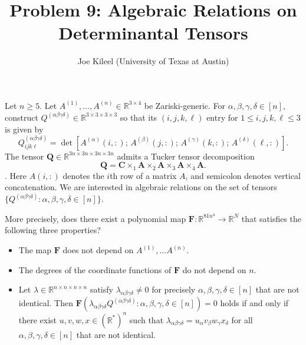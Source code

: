 

\title{Problem 9: Algebraic Relations on Determinantal Tensors}
\author{Joe Kileel (University of Texas at Austin)}
\date{}


\maketitle

Let $n \geq 5$.
Let $A^{(1)}, \ldots, A^{(n)} \in \mathbb{R}^{3 \times 4}$ be Zariski-generic.
For $\alpha, \beta, \gamma, \delta \in [n]$, construct $Q^{(\alpha \beta \gamma \delta)} \in \mathbb{R}^{3 \times 3 \times 3 \times 3}$ so that its $(i, j, k, \ell)$ entry for $1 \leq i, j, k, \ell \leq 3$ is given by
\[
Q^{(\alpha \beta \gamma \delta)}_{i j k \ell} = \det [A^{(\alpha)}(i, :);\, A^{(\beta)}(j, :);\, A^{(\gamma)}(k, :);\, A^{(\delta)}(\ell, :)].
\]
The tensor $\mathbf{Q} \in \mathbb{R}^{3n\times 3n\times 3n\times 3n}$ admits a Tucker tensor decomposition \[
\mathbf{Q}
= \mathbf{C}
\times_1 \mathbf{A}
\times_2 \mathbf{A}
\times_3 \mathbf{A}
\times_4 \mathbf{A}.
\].
Here $A(i, :)$ denotes the $i$th row of a matrix $A$, and semicolon denotes vertical concatenation. We are interested in algebraic relations on the set of tensors $\{Q^{(\alpha \beta \gamma \delta)} : \alpha, \beta, \gamma, \delta \in [n] \}$.

More precisely, does there exist a polynomial map $\mathbf{F}: \mathbb{R}^{81n^4} \rightarrow \mathbb{R}^N$ that satisfies the following three properties?

\begin{itemize}\setlength\itemsep{0.5em}
\item The map $\mathbf{F}$ does not depend on $A^{(1)}, \ldots A^{(n)}$.
\item The degrees of the coordinate functions of $\mathbf{F}$ do not depend on $n$.
\item Let $\lambda \in \mathbb{R}^{n \times n \times n \times n}$ satisfy $\lambda_{\alpha \beta \gamma \delta} \neq 0$ for precisely $\alpha, \beta, \gamma, \delta \in [n]$ that are not identical.  Then $\mathbf{F}(\lambda_{\alpha \beta \gamma \delta} Q^{(\alpha \beta \gamma \delta)} : \alpha, \beta, \gamma, \delta \in [n]) = 0$ holds if and only if there exist $u, v, w, x \in (\mathbb{R}^*)^n$ such that $\lambda_{\alpha \beta \gamma \delta} = u_{\alpha} v_{\beta} w_{\gamma} x_{\delta}$ for all $\alpha, \beta, \gamma, \delta \in [n]$ that are not identical.
\end{itemize}


